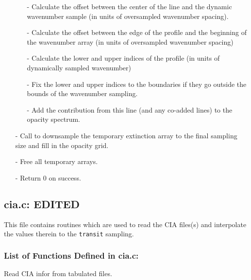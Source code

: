 \documentclass[letterpaper,12pt]{article}
\begin{document}
\begin{enumerate}[leftmargin=10pt, noitemsep, parsep=0pt, topsep=0ex]
\begin{enumerate}[leftmargin=10pt, noitemsep, parsep=0pt, topsep=0ex]
\item[-] Calculate the offset between the center of the line and the dynamic wavenumber sample (in units of oversampled wavenumber spacing).
\item[-] Calculate the offset between the edge of the profile and the beginning of the wavenumber array (in units of oversampled wavenumber spacing)
\item[-] Calculate the lower and upper indices of the profile (in units of dynamically sampled wavenumber)
\item[-] Fix the lower and upper indices to the boundaries if they go outside the bounds of the wavenumber sampling.
\item[-] Add the contribution from this line (and any co-added lines) to the opacity spectrum.
\end{enumerate}
\item[-] Call  to downsample the temporary extinction array to the final sampling size and fill in the opacity grid.
\item[-] Free all temporary arrays.
\item[-] Return 0 on success.
\end{enumerate}

\newpage
\subsection{cia.c: EDITED}
This file contains routines which are used to read the CIA files(s) and interpolate the values therein to the {\tt transit} sampling.
\subsubsection{List of Functions Defined in cia.c:}
Read CIA infor from tabulated files. \newline

 \newline

 \newline
\end{document}

